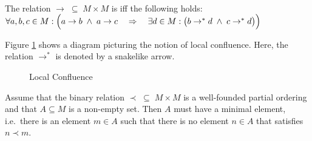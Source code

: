 \begin{Definition} \hspace*{\fill} \\
  The relation $\rightarrow \;\subseteq\; M \times M$ is  iff the following holds:
  \\[0.2cm]
  \hspace*{1.3cm}
  $\forall a, b, c \in M: \Bigl(a \rightarrow b \;\wedge\; a \rightarrow c \quad\Rightarrow\quad
   \exists d \in M: \bigl(b \rightarrow^* d \;\wedge\; c \rightarrow^* d\bigr)\Bigr)
  $  \eox
\end{Definition}

\noindent
Figure \ref{fig:local-confluence.tikz} shows a diagram picturing the notion of local confluence.
Here, the relation $\rightarrow^*$ is denoted by a snakelike arrow.
\begin{figure}[!ht]
    \centering
    \caption{Local Confluence}
    \label{fig:local-confluence.tikz}
\end{figure}

\begin{Lemma}
  Assume that the binary relation $\prec \;\subseteq\; M \times M$ is a well-founded partial ordering and that
  $A \subseteq M$ is a non-empty set.  Then $A$ must have a minimal element, i.e.~there is an element $m \in A$
  such that there is no element $n \in A$ that satisfies $n \prec m$.
\end{Lemma}

